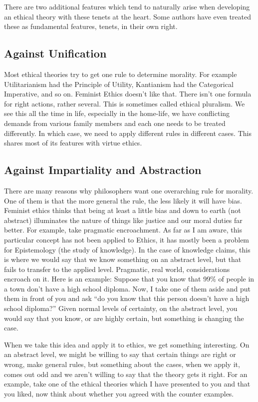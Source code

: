 There are two additional features which tend to naturally arise when developing an ethical theory with these tenets at the heart. Some authors have even treated these as fundamental features, tenets, in their own right. 

\subsection{Against Unification}

Most ethical theories try to get one rule to determine morality. For example Utilitarianism had the Principle of Utility, Kantianism had the Categorical Imperative, and so on. Feminist Ethics doesn’t like that. There isn’t one formula for right actions, rather several. This is sometimes called ethical pluralism. We see this all the time in life, especially in the home-life, we have conflicting demands from various family members and each one needs to be treated differently. In which case, we need to apply different rules in different cases. This shares most of its features with virtue ethics.

\subsection{Against Impartiality and Abstraction}

There are many reasons why philosophers want one overarching rule for morality. One of them is that the more general the rule, the less likely it will have bias. Feminist ethics thinks that being at least a little bias and down to earth (not abstract) illuminates the nature of things like justice and our moral duties far better. For example, take pragmatic encroachment.  As far as I am aware, this particular concept has not been applied to Ethics, it has mostly been a problem for Epistemology (the study of knowledge). In the case of knowledge claims, this is where we would say that we know something on an abstract level, but that fails to transfer to the applied level. Pragmatic, real world, considerations encroach on it. Here is an example: Suppose that you know that 99\% of people in a town don’t have a high school diploma. Now, I take one of them aside and put them in front of you and ask “do you know that this person doesn’t have a high school diploma?” Given normal levels of certainty, on the abstract level, you would say that you know, or are highly certain, but something is changing the case.

When we take this idea and apply it to ethics, we get something interesting. On an abstract level, we might be willing to say that certain things are right or wrong, make general rules, but something about the cases, when we apply it, comes out odd and we aren’t willing to say that the theory gets it right. For an example, take one of the ethical theories which I have presented to you and that you liked, now think about whether you agreed with the counter examples.
 

